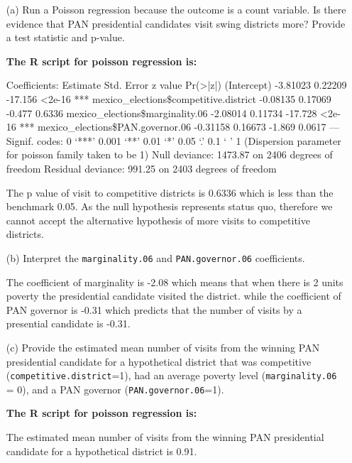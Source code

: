 \documentclass[12pt,letterpaper]{article}
\begin{document}
\begin{enumerate}
	\item [(a)]
	Run a Poisson regression because the outcome is a count variable. Is there evidence that PAN presidential candidates visit swing districts more? Provide a test statistic and p-value.

	\textbf{		The R script for poisson regression is:}
	
	
	Coefficients: \newline                                     
	Estimate Std. Error z value Pr(>|z|)   \newline 
	(Intercept)                     -3.81023    0.22209 -17.156   <2e-16 ***\newline
	 mexico\_elections\$competitive.district -0.08135    0.17069  -0.477   0.6336   \newline mexico\_elections\$marginality.06       -2.08014    0.11734 -17.728   <2e-16 *** \newline
	 mexico\_elections\$PAN.governor.06      -0.31158    0.16673  -1.869   0.0617 \newline 
	 ---Signif. codes:  0 ‘***’ 0.001 ‘**’ 0.01 ‘*’ 0.05 ‘.’ 0.1 ‘ ’ 1 \newline
	 (Dispersion parameter for poisson family taken to be 1)   \newline
	  Null deviance: 1473.87  on 2406  degrees of freedom\newline
	  Residual deviance:  991.25  on 2403  degrees of freedom
	
	The p value of visit to competitive districts is 0.6336 which is less than the benchmark 0.05. As the null hypothesis represents status quo, therefore we cannot accept the alternative hypothesis of more visits to competitive districts. 
	
	\item [(b)]
	Interpret the \texttt{marginality.06} and \texttt{PAN.governor.06} coefficients.
	
	The coefficient of marginality is -2.08 which means that when there is 2 units poverty the presidential candidate visited the district. while the coefficient of PAN governor is -0.31 which predicts that the number of visits by a presential candidate is -0.31.
	
	\newpage
	
	\item [(c)]
	Provide the estimated mean number of visits from the winning PAN presidential candidate for a hypothetical district that was competitive (\texttt{competitive.district}=1), had an average poverty level (\texttt{marginality.06} = 0), and a PAN governor (\texttt{PAN.governor.06}=1).
	
	\textbf{		The R script for poisson regression is:}
	
	
	The estimated mean number of visits from the winning PAN presidential candidate for a hypothetical district is 0.91.
	
\end{enumerate}
\end{document}
